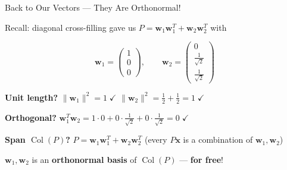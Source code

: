 \documentclass[10pt]{beamer}
\theoremstyle{definition}
\newcommand{\x}[1]{\alert{\textbf{#1}}}
\begin{document}
%
\begin{frame}{Back to Our Vectors --- They Are Orthonormal!}

Recall: diagonal cross-filling gave us $P = \mathbf{w}_1\mathbf{w}_1^T + \mathbf{w}_2\mathbf{w}_2^T$ with

$$\mathbf{w}_1 = \begin{pmatrix} 1 \\ 0 \\ 0 \end{pmatrix}, \qquad \mathbf{w}_2 = \begin{pmatrix} 0 \\ \frac{1}{\sqrt{2}} \\ \frac{1}{\sqrt{2}} \end{pmatrix}$$

\vspace{0.3em}

\x{Unit length?} \quad $\|\mathbf{w}_1\|^2 = 1 \;\checkmark$ \qquad $\|\mathbf{w}_2\|^2 = \tfrac{1}{2} + \tfrac{1}{2} = 1 \;\checkmark$

\vspace{0.3em}

\x{Orthogonal?} \quad $\mathbf{w}_1^T \mathbf{w}_2 = 1 \cdot 0 + 0 \cdot \tfrac{1}{\sqrt{2}} + 0 \cdot \tfrac{1}{\sqrt{2}} = 0 \;\checkmark$

\vspace{0.3em}

\x{Span $\operatorname{Col}(P)$?} \quad $P = \mathbf{w}_1\mathbf{w}_1^T + \mathbf{w}_2\mathbf{w}_2^T$ \;\checkmark \quad (every $P\mathbf{x}$ is a combination of $\mathbf{w}_1, \mathbf{w}_2$)

\vspace{0.5em}

$\mathbf{w}_1, \mathbf{w}_2$ is an \x{orthonormal basis} of $\operatorname{Col}(P)$ --- \x{for free}!

\end{frame}
\end{document}
